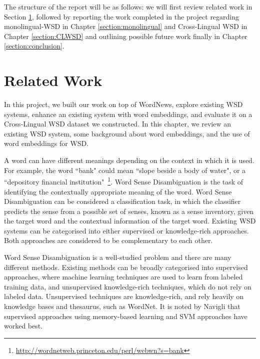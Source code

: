 \documentclass[11pt]{article}
\begin{document}
The structure of the report will be as follows: we will first review related work in Section \ref{ch:related}, followed by reporting the work completed in the project regarding monolingual-WSD in Chapter \ref{section:monolingual} and Cross-Lingual WSD in Chapter \ref{section:CLWSD} and outlining possible future work finally in Chapter \ref{section:conclusion}. 

\section{Related Work}
\label{ch:related}

In this project, we built our work on top of WordNews, explore existing WSD systems, enhance an existing system with word embeddings, and evaluate it on a Cross-Lingual WSD dataset we constructed. In this chapter, we review an existing WSD system, some background about word embeddings, and the use of word embeddings for WSD. 


A word can have different meanings depending on the context in which it is used. For example, the word ``bank" could mean ``slope beside a body of water", or a ``depository financial institution"~\footnote{\url{http://wordnetweb.princeton.edu/perl/webwn?s=bank}}. Word Sense Disambiguation is the task of identifying the contextually appropriate meaning of the word. Word Sense Disambiguation can be considered a classification task, in which the classifier predicts the sense from a possible set of senses, known as a sense inventory, given the target word and the contextual information of the target word. Existing WSD systems can be categorised into either supervised or knowledge-rich approaches. Both approaches are considered to be complementary to each other. 


Word Sense Disambiguation is a well-studied problem and there are many different methods. Existing methods can be broadly categorised into supervised approaches, where machine learning techniques are used to learn from labeled training data, and unsupervised knowledge-rich techniques, which do not rely on labeled data. Unsupervised techniques are knowledge-rich, and rely heavily on knowledge bases and thesaurus, such as WordNet. It is noted by Navigli  that supervised approaches using memory-based learning and SVM approaches have worked best. 
\end{document}
